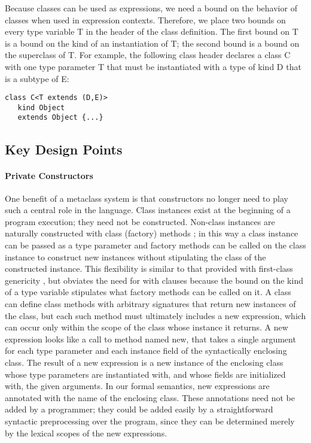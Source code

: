 \documentclass{acmconfbig}
\begin{document}
Because classes can be used as expressions, we need a bound on the
behavior of classes when used in expression contexts.  Therefore, we
place two bounds on every type variable {\txt T} in the header of the
class definition. The first bound on {\txt T} is a bound on the kind
of an instantiation of {\txt T}; the second bound is a bound on the
superclass of {\txt T}. For example, the following class header
declares a class {\txt C} with one type parameter {\txt T} that must
be instantiated with a type of kind {\txt D} that is a subtype of
{\txt E}:

\begin{verbatim}
class C<T extends (D,E)>
   kind Object
   extends Object {...}
\end{verbatim}


\subsection{Key Design Points}

\paragraph{Private Constructors}
\label{privconst}

One benefit of a metaclass system is that constructors no longer need
to play such a central role in the language. Class instances exist at
the beginning of a program execution; they need not be
constructed. Non-class instances are naturally constructed with class
(factory) methods \cite{GOF}; in this way a class instance can be
passed as a type parameter and factory methods can be called on the
class instance to construct new instances without stipulating the
class of the constructed instance. This flexibility is similar to that
provided with first-class genericity \cite{NextGen, MixGen}, but
obviates the need for {\txt with} clauses because the bound on the
kind of a type variable stipulates what factory methods can be called
on it.  A class can define class methods with arbitrary signatures
that return new instances of the class, but each such method must
ultimately includes a {\txt new} expression, which can occur only
within the scope of the class whose instance it returns. A {\txt new}
expression looks like a call to method named {\txt new}, that takes a
single argument for each type parameter and each instance field of the
syntactically enclosing class. The result of a {\txt new} expression
is a new instance of the enclosing class whose type parameters are
instantiated with, and whose fields are initialized with, the given
arguments. In our formal semantics, {\txt new} expressions are
annotated with the name of the enclosing class. These annotations need
not be added by a programmer; they could be added easily by a
straightforward syntactic preprocessing over the program, since they
can be determined merely by the lexical scopes of the {\txt new}
expressions.
\end{document}
